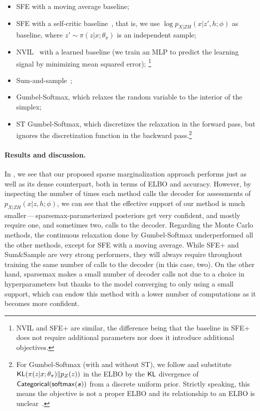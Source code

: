 \begin{itemize}
    \item SFE with a moving average baseline;
    \item SFE with a self-critic
          baseline~\citep[SFE+;][]{rennie2017self}, that is, we use $\log
              p_{X|ZH}(x|z', h; \phi)$ as baseline, where $z' \sim \pi(z|x; \theta_\pi)$
          is an independent sample;
    \item NVIL~\citep{mnih2014neural}
          with a learned baseline (we train an MLP to predict the learning
          signal by minimizing mean squared error);
          \footnote{NVIL and SFE+ are
              similar, the difference being that the baseline in SFE+ does not
              require additional parameters nor does it introduce additional
              objectives.}
    \item Sum-and-sample~\citep{RB19};
    \item Gumbel-Softmax, which relaxes the random variable to the interior of the simplex;
    \item ST Gumbel-Softmax, which discretizes the relaxation in
          the forward pass, but ignores the discretization function in the
          backward pass.\footnote{For Gumbel-Softmax (with and
              without ST), we follow \citet{GumbelSoftmax} and substitute
              $\operatorname{\mathsf{KL}}(\pi(z|x; \theta_\pi) \| p_Z(z))$ in the ELBO by the $\operatorname{\mathsf{KL}}$
              divergence of $\operatorname{\mathsf{Categorical}}(\operatorname*{\mathsf{softmax}}(\bm{s}))$ from a discrete uniform prior.
              Strictly speaking, this means the objective is not a proper ELBO and
              its relationship to an ELBO is unclear~\citep[Appendix
                  C.2]{Concrete}.}
\end{itemize}

\paragraph*{Results and discussion.}
In , we see that our proposed sparse
marginalization approach performs just as well as its dense
counterpart, both in terms of ELBO and accuracy. However, by
inspecting the number of times each method calls the decoder for
assessments of $p_{X|ZH}(x|z, h;\phi)$, we can see that the effective
support of our method is much smaller\,---\,sparsemax-parameterized
posteriors get very confident, and mostly require one, and sometimes
two, calls to the decoder. Regarding the Monte Carlo methods, the
continuous relaxation done by Gumbel-Softmax underperformed all the
other methods, except for SFE with a moving average. While
SFE+ and Sum\&Sample are very strong performers, they will always
require throughout training the same number of calls to the decoder
(in this case, two). On the other hand, sparsemax makes a small
number of decoder calls not due to a choice in hyperparameters but
thanks to the model converging to only using a small support, which
can endow this method with a lower number of computations as it
becomes more confident.

